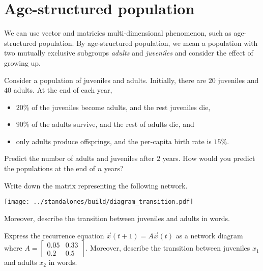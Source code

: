 \documentclass[../main.tex]{subfiles}
\begin{document}
 \section{Age-structured population}

We can use vector and matricies multi-dimensional phenomenon, such as age-structured population.  By age-structured population, we mean a population with two mutually exclusive subgroups \emph{adults} and \emph{juveniles} and consider the effect of growing up.

\begin{example}
  Consider a population of juveniles and adults. Initially, there are \(20\) juveniles and \(40\) adults. At the end of each year, 
  \begin{itemize}[itemsep={0ex}]
    \item \(20\%\) of the juveniles become adults, and the rest juveniles die, 
    \item \(90\%\) of the adults survive, and the rest of adults die, and
    \item only adults produce offsprings, and the per-capita birth rate is \(15\%\).
  \end{itemize}

  Predict the number of adults and juveniles after \(2\) years.  How would you predict the populations at the end of \(n\) years?

  \clearpage
\end{example}
\clearpage

\begin{example}
  Write down the matrix representing the following network.

  \begin{center}
    \texttt{[image: ../standalones/build/diagram\_transition.pdf]}
  \end{center}

  Moreover, describe the transition between juveniles and adults in words.

\end{example}

\begin{example}
  Express the recurrence equation \(\vec{x}(t+1) = A \vec{x}(t)\) as a network diagram where \(A = \begin{bmatrix} 0.05 & 0.33 \\ 0.2 & 0.5 \end{bmatrix}\). Moreover, describe the transition between juveniles \(x_{1}\) and adults \(x_{2}\) in words.

\end{example}
\end{document}
